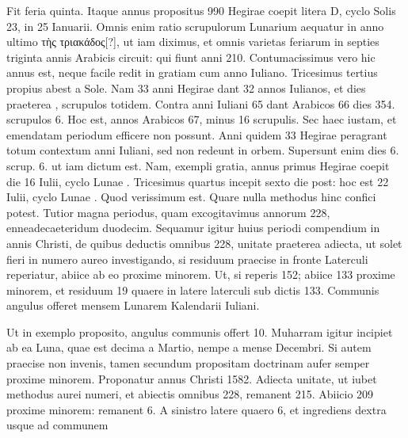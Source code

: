 Fit feria quinta.
Itaque annus propositus
990 Hegirae coepit litera \textsc{D}, cyclo Solis 23, in 25 Ianuarii.
%
Omnis
enim ratio scrupulorum Lunarium aequatur in anno ultimo
 \textgreek{τὴς τριακάδος[?]},
ut iam diximus, et omnis varietas feriarum %
 in septies triginta annis Arabicis
circuit: qui fiunt anni 210.
Contumacissimus vero hic annus est, neque
facile redit in gratiam %
 cum anno Iuliano.
Tricesimus tertius propius abest
a Sole.
Nam 33 anni Hegirae dant 32 annos Iulianos, et dies praeterea
, scrupulos %
 totidem.
Contra anni Iuliani 65 dant Arabicos 66 dies 354.
scrupulos 6.
Hoc est, annos Arabicos 67, minus 16 scrupulis.
Sec haec
iustam, et emendatam periodum efficere non possunt.
Anni quidem 33
Hegirae peragrant totum %
 contextum anni Iuliani, sed non redeunt in orbem.
Supersunt enim dies 6. scrup. %
 6. ut iam dictum est.
Nam, exempli
gratia, annus primus Hegirae coepit die 16 Iulii, cyclo Lunae .
Tricesimus
quartus incepit sexto die post: hoc est 22 Iulii, cyclo Lunae .
Quod verissimum est.
Quare nulla methodus hinc confici %
 potest.
Tutior
magna periodus, quam excogitavimus annorum 228, enneadecaeteridum
duodecim.
Sequamur igitur huius periodi compendium in annis
Christi, de quibus deductis omnibus 228, unitate praeterea adiecta,
ut solet fieri in numero aureo investigando, si residuum praecise in fronte
Laterculi reperiatur, abiice ab eo proxime minorem. %
Ut, si reperis 152;
abiice 133 proxime minorem, %
 et residuum 19 quaere in latere laterculi
sub dictis 133.
Communis angulus offeret mensem Lunarem Kalendarii
Iuliani.
\begin{table}[htbp]
  
\end{table}
%
Ut in exemplo %
proposito, angulus
communis offert
10.
Muharram igitur
incipiet ab ea Luna,
quae est decima a
Martio, nempe a mense %
Decembri.
Si autem
praecise non invenis,
tamen secundum propositam doctrinam aufer semper proxime
minorem.
Proponatur annus Christi 1582.
Adiecta unitate,
ut iubet methodus aurei numeri, et abiectis omnibus 228, remanent
215.
Abiicio 209 proxime minorem: remanent 6.
A sinistro
latere quaero 6, et ingrediens dextra usque ad communem
